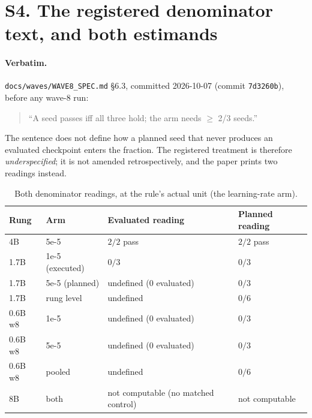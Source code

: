 \documentclass[11pt,a4paper]{article}
\begin{document}
\section{S4. The registered denominator text, and both estimands}

\paragraph{Verbatim.} \texttt{docs/waves/WAVE8\_SPEC.md} \S6.3, committed 2026-10-07 (commit
\texttt{7d3260b}), before any wave-8 run:

\begin{quote}
``A seed passes iff all three hold; the arm needs $\geq$ 2/3 seeds.''
\end{quote}

\noindent The sentence does not define how a planned seed that never produces an evaluated
checkpoint enters the fraction. The registered treatment is therefore \emph{underspecified}; it is
not amended retrospectively, and the paper prints two readings instead.

\begin{table}[h]
\centering
\small
\caption{Both denominator readings, at the rule's actual unit (the learning-rate arm).}
\label{tab:s4}
\begin{tabular}{@{}p{2.4cm}p{2.3cm}p{3.4cm}p{4.0cm}@{}}
\toprule
\textbf{Rung} & \textbf{Arm} & \textbf{Evaluated reading} & \textbf{Planned reading} \\
\midrule
4B & 5e-5 & $2/2$ pass & $2/2$ pass \\
1.7B & 1e-5 (executed) & $0/3$ & $0/3$ \\
1.7B & 5e-5 (planned) & undefined (0 evaluated) & $0/3$ \\
1.7B & rung level & undefined & $0/6$ \\
0.6B w8 & 1e-5 & undefined (0 evaluated) & $0/3$ \\
0.6B w8 & 5e-5 & undefined (0 evaluated) & $0/3$ \\
0.6B w8 & pooled & undefined & $0/6$ \\
8B & both & not computable (no matched control) & not computable \\
\bottomrule
\end{tabular}
\end{table}
\end{document}
